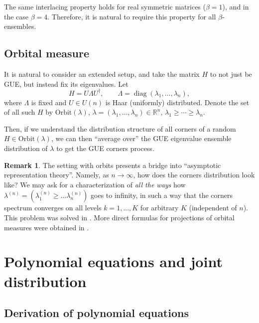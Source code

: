 \documentclass[letterpaper,11pt,oneside,reqno]{article}
\numberwithin{equation}{section}
\theoremstyle{definition}
\newtheorem{remark}[proposition]{Remark}
\begin{document}
The same interlacing property holds for real symmetric matrices ($\beta=1$),
and in the case $\beta=4$.
Therefore, it is natural to require this property for all $\beta$-ensembles.

\subsection{Orbital measure}

It is natural to consider an extended setup, and
take the matrix $H$ to not just be GUE, but instead fix its eigenvalues.
Let
\begin{equation*}
	H=U\Lambda U^\dagger,\qquad \Lambda=\operatorname{diag}(\lambda_1,\dots,\lambda_n),
\end{equation*}
where $\Lambda$ is fixed and $U\in U(n)$ is Haar (uniformly) distributed.
Denote the set of all such $H$
by $\mathrm{Orbit}(\lambda)$, $\lambda=(\lambda_1,\dots,\lambda_n)\in \mathbb{R}^n$,
$\lambda_1\ge \cdots\ge \lambda_n$.

Then, if we understand the distribution structure
of all corners of a random $H\in \mathrm{Orbit}(\lambda)$,
we can then ``average over'' the GUE eigenvalue ensemble distribution of $\lambda$
to get the GUE corners process.

\begin{remark}
	The setting with orbits presents a bridge into ``asymptotic representation theory''.
	Namely, as $n\to\infty$, how does the corners distribution look like?
	We may ask for a characterization of \emph{all the ways} how
	$\lambda^{(n)}=( \lambda_1^{(n)}\ge \ldots \lambda^{(n)}_n  )$
	goes to infinity, in such a way that the corners
	spectrum converges on all levels $k=1,\ldots,K $ for arbitrary $K$ (independent of
	$n$).
	This problem was solved in \cite{OlVer1996}.
	More direct formulas for projections of orbital measures
	were obtained in \cite{olshanski2013projections}.
\end{remark}


\section{Polynomial equations and joint distribution}

\subsection{Derivation of polynomial equations}
\end{document}
